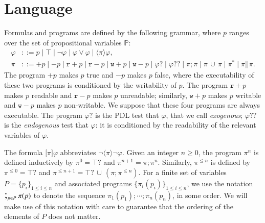 \documentclass{llncs}
\newcommand{\atm}{x}
\newcommand{\pll}{ {||} }							%
\newcommand{\testendo}{?\!\!?}			%
\newcommand{\testpdl}{?}				%
\newcommand{\ah}[1]{\footnote{\textbf{AH:} #1}}
\newcommand{\assgn}[2]{{#1 {:=} #2}}
\newcommand{\assgntopR}[1]{{\mathtt r {+} #1}}
\newcommand{\assgnbotR}[1]{{\mathtt r {-} #1}}
\newcommand{\assgntopW}[1]{{\mathtt w {+} #1}}
\newcommand{\assgnbotW}[1]{{\mathtt w {-} #1}}
\newcommand{\assgntopV}[1]{{\mathtt {+} #1}}
\newcommand{\assgnbotV}[1]{{\mathtt {-} #1}}
\newcommand{\ifthen}[2]{\mathbf{if}\ #1 \ \mathbf{then}\ #2}
\newcommand{\lbox}[1]{ \big[ #1 \big] }
\newcommand{\ldia}[1]{ \big\langle #1 \big\rangle}
\newcommand{\ndet}{\,{\cup}\,}
\renewcommand{\phi}{\varphi}
\newcommand{\propset}{\mathbb P}
\newcommand{\seqseq}[1]{ \text{\Large ;}_{#1} ~ }
\begin{document}
\section{Language}\label{sec:language}

Formulas and programs are defined by the following grammar,
where $p$ ranges over the set of propositional variables $\propset$:
\begin{align*}
\phi & ::= p \mid \top  \mid  \lnot \phi  \mid  \phi \lor \phi  \mid  \ldia \pi \phi ,
\\
\pi & ::= \assgntopV p \mid \assgnbotV p \mid
		\assgntopR p \mid \assgnbotR p \mid
		\assgntopW p \mid \assgnbotW p \mid
			\phi \testpdl \mid 
			\phi \testendo \mid 
			\pi ; \pi \mid \pi \ndet \pi \mid 
			\pi^\ast \mid \pi \pll \pi .
\end{align*}
The program $\assgntopV p$ makes $p$ true and $\assgnbotV p $ makes $p$ false, where the executability of these two programs is conditioned by the writability of $p$. 
%
The program $\assgntopR p$ makes $p$ readable and 
$\assgnbotR p $ makes $p$ unreadable; similarly,
$\assgntopW p$ makes $p$ writable and 
$\assgnbotW p$ makes $p$ non-writable.
We suppose that these four programs are always executable. 
The program $\phi \testpdl$ is the PDL test that $\phi$, that we call \emph{exogenous};
$\phi \testendo $ is the \emph{endogenous} test that $\phi$: it is 
conditioned by the readability of the relevant variables of $\phi$. 

The formula $\lbox \pi \phi$ abbreviates $\lnot \ldia \pi \lnot \phi$.
Given an integer $n \geq 0$, the program $\pi^n$ is defined inductively by 
$\pi^0 = \top \testpdl $ and 
$\pi^{n+1} = \pi ; \pi^n $. 
Similarly, $\pi^{\leq n}$ is defined by 
$\pi^{\leq 0} = \top \testpdl $ and 
$\pi^{\leq n+1} = \top \testpdl \ndet (\pi ; \pi^{\leq n}) $. 
For a finite set of variables 
$P = \{p_i\}_{1 \leq  i \leq n}$ 
and associated programs 
$\{ \pi_i(p_i)\}_{1 \leq  i \leq n}$,
we use the notation
$\seqseq{p \in P} \pi(p)$ to denote the sequence
$ \pi_1(p_1) ; \cdots ; \pi_n(p_n)$, in some order. 
We will make use of this notation with care to guarantee that the ordering of the elements of $P$ does not matter. 
\end{document}
